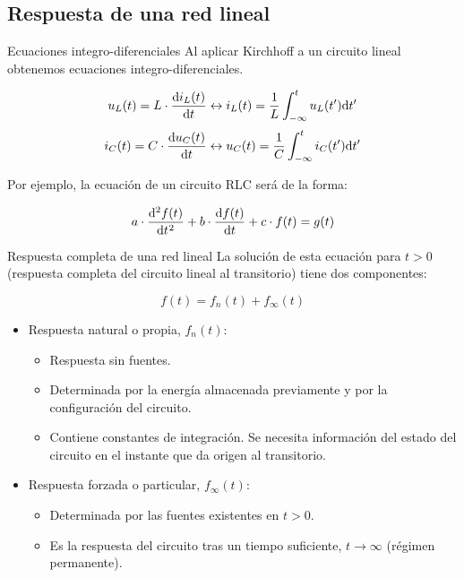 \documentclass[aspectratio=169, xcolor={usenames,svgnames,dvipsnames}]{beamer}
\begin{document}
\subsection{Respuesta de una red lineal}
\label{sec:org58d9af7}

\begin{frame}[label={sec:org0b0a869}]{Ecuaciones integro-diferenciales}
Al aplicar Kirchhoff a un circuito lineal obtenemos ecuaciones integro-diferenciales. 

\[
  u_L(t) = L \cdot \diff{i_L(t)}{t}
  \leftrightarrow
  i_L(t) = \frac{1}{L} \int^t_{-\infty}u_L(t') \mathrm{d}t'
\]
\[
  i_C(t) = C \cdot \diff{u_C(t)}{t}
  \leftrightarrow
  u_C(t) = \frac{1}{C} \int^t_{-\infty}i_C(t') \mathrm{d}t'
\]

Por ejemplo, la ecuación de un circuito RLC será de la forma:

\[
  a \cdot \diff[2]{f(t)}{t} + b \cdot \diff{f(t)}{t} + c \cdot f(t) = g(t)
\]
\end{frame}

\begin{frame}[label={sec:org2b23de2}]{Respuesta completa de una red lineal}
La solución de esta ecuación para \(t > 0\) (respuesta completa del circuito lineal al transitorio) tiene dos componentes:

\[
 \boxed{f(t) = f_n(t) + f_\infty(t) }
 \]

\begin{itemize}
\item Respuesta \alert{natural} o propia, \(f_n(t)\):
\begin{itemize}
\item Respuesta sin fuentes.
\item Determinada por la energía almacenada previamente y por la configuración del circuito.
\item Contiene constantes de integración. Se necesita información del estado del circuito en el instante que da origen al transitorio.
\end{itemize}
\item Respuesta \alert{forzada} o particular, \(f_\infty(t)\):
\begin{itemize}
\item Determinada por las fuentes existentes en \(t > 0\).
\item Es la respuesta del circuito tras un tiempo suficiente, \(t \to \infty\) (régimen permanente).
\end{itemize}
\end{itemize}
\end{frame}
\end{document}
